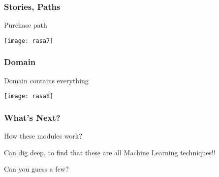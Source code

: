 \begin{frame}[fragile]\frametitle{Stories, Paths}

Purchase path

\begin{center}
\texttt{[image: rasa7]}
\end{center}



\end{frame}

\begin{frame}[fragile]\frametitle{Domain}

Domain contains everything

\begin{center}
\texttt{[image: rasa8]}
\end{center}



\end{frame}


\begin{frame}[fragile]\frametitle{What's Next?}
How these modules work? 

Can dig deep, to find that these are all Machine Learning techniques!!

Can you guess a few?

\end{frame}
